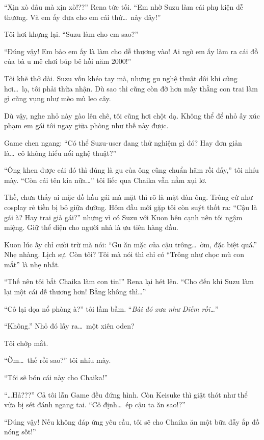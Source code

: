 \documentclass[../main.tex]{subfiles}
\begin{document}
``Xịn xò đâu mà xịn xò!??'' Rena tức tối. ``Em nhờ Suzu làm cái phụ kiện dễ thương. Và em ấy đưa cho em cái thứ\dots\ này đây!''

Tôi hơi khựng lại. ``Suzu làm cho em sao?''

``Đúng vậy! Em bảo em ấy là làm cho dễ thương vào! Ai ngờ em ấy làm ra cái đồ của bà u mê chơi búp bê hồi năm 2000!''

Tôi khẽ thở dài. Suzu vốn khéo tay mà, nhưng gu nghệ thuật dôi khi cũng hơi\dots\ lạ, tôi phải thừa nhận. Dù sao thì cũng còn đỡ hơn mấy thằng con trai làm gì cũng vụng như mèo mù leo cây.

Dù vậy, nghe nhỏ này gào lên chê, tôi cũng hơi chột dạ. Không thể để nhỏ ấy xúc phạm em gái tôi ngay giữa phòng như thế này được.

Game chen ngang: ``Có thể Suzu-user đang thử nghiệm gì đó? Hay đơn giản là\dots\ cô không hiểu nổi nghệ thuật?''

``Ông khen được cái đó thì đúng là gu của ông cũng chuẩn hãm rồi đấy,'' tôi nhíu mày. ``Còn cái tên kia nữa\dots'' tôi liếc qua Chaika vẫn nằm xụi lơ.

Thề, chưa thấy ai mặc đồ hầu gái mà mặt thì rõ là mặt đàn ông. Trông cứ như cosplay rẻ tiền bị bỏ giữa đường. Hôm đầu mới gặp tôi còn suýt thốt ra: ``Cậu là gái à? Hay trai giả gái?''  nhưng vì có Suzu với Kuon bên cạnh nên tôi ngậm miệng. Giữ thể diện cho người nhà là ưu tiên hàng đầu.

Kuon lúc ấy chỉ cười trừ mà nói: ``Gu ăn mặc của cậu trông\dots\ ờm, đặc biệt quá.'' Nhẹ nhàng. Lịch sự. Còn tôi? Tôi mà nói thì chỉ có ``Trông như chọc mù con mắt'' là nhẹ nhất.

``Thế nên tôi bắt Chaika làm con tin!'' Rena lại hét lên. ``Cho đến khi Suzu làm lại một cái dễ thương hơn! Bằng không thì\dots''

``Cô lại dọa nổ phòng à?'' tôi lầm bầm. ``\textit{Bài đó xưa như Diễm rồi\dots}''

``Không.'' Nhỏ đó lấy ra\dots\ một xiên oden?

Tôi chớp mắt.

``Ờm\dots\ thế rồi sao?'' tôi nhíu mày.

``Tôi sẽ bón cái này cho Chaika!''


``\dots Hả???'' Cả tôi lẫn Game đều đứng hình. Còn Keisuke thì giật thót như thể vừa bị sét đánh ngang tai. ``Cô định\dots\ ép cậu ta ăn sao!?''

``Đúng vậy! Nếu không đáp ứng yêu cầu, tôi sẽ cho Chaika ăn một bữa đẫy ắp đồ nóng sốt!''
\end{document}
